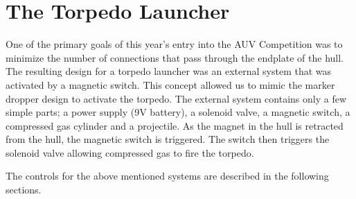\section{The Torpedo Launcher}
\label{torpedo}
\vspace{-.1in}
One of the primary goals of this year's entry into the AUV Competition
was to minimize the number of connections that pass through the
endplate of the hull.  The resulting design for a torpedo launcher was
an external system that was activated by a magnetic switch.  This
concept allowed us to mimic the marker dropper design to activate the
torpedo.  The external system  contains only a few simple parts; a
power supply (9V battery), a solenoid valve, a magnetic switch, a
compressed gas cylinder and a projectile. As the magnet in the hull
is retracted from the hull, the magnetic switch is
triggered.  The switch  then triggers the solenoid valve allowing
compressed gas to fire the torpedo.

The controls for the above mentioned systems are described in the
following sections.
